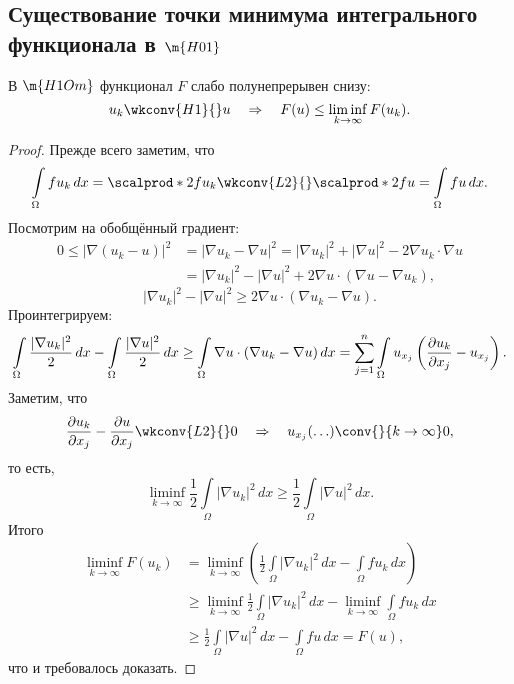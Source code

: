 \subsection{Существование точки минимума интегрального функционала в $\m{H01}$}
\begin{lemma} В $\m{H1Om}$ функционал $F$ слабо полунепрерывен снизу:
$$u_k \wkconv{H1}{} u \quad \Rightarrow \quad F(u) \leq \liminf_{k \to \infty} F(u_k).$$
\end{lemma}
\begin{proof} Прежде всего заметим, что
$$ \int \limits_\Omega f u_k \, dx = \scalprod*{2}{f}{u_k} \wkconv{L2}{} \scalprod*{2}{f}{u} =\int \limits_\Omega f u \, dx.$$
Посмотрим на обобщённый градиент:
\begin{align*}
0 \leq | \nabla (u_k - u) |^2 &= | \nabla u_k - \nabla u |^2 = |\nabla u_k|^2 + |\nabla u|^2 - 2 \nabla u_k \cdot \nabla u \\
&= |\nabla u_k|^2 - |\nabla u|^2 + 2 \nabla u \cdot (\nabla u - \nabla u_k),
\end{align*}
$$ |\nabla u_k|^2 - |\nabla u|^2 \geq 2 \nabla u \cdot (\nabla u_k - \nabla u).$$
Проинтегрируем:
$$ \int \limits_\Omega \frac {| \nabla u_k|^2} {2} \, dx - \int \limits_\Omega \frac {| \nabla u|^2} {2} \, dx \geq \int \limits_\Omega \nabla u \cdot (\nabla u_k - \nabla u) \, dx = \sum_{j=1}^n \int \limits_\Omega u_{x_j} \left( \pder[u_k]{x_j} - u_{x_j} \right) .$$
Заметим, что
$$ \pder[u_k]{x_j} - \pder[u]{x_j} \wkconv{L2}{} 0 \quad \Rightarrow \quad u_{x_j} (\hdots) \conv{}{k \to \infty} 0,$$
то есть,
$$ \liminf_{k \to \infty} \frac {1} {2} \int \limits_\Omega |\nabla u_k|^2 \, dx \geq \frac {1} {2} \int \limits_\Omega |\nabla u|^2 \, dx.$$
Итого
\begin{align*}
\liminf_{k \to \infty} F(u_k) &= \liminf_{k \to \infty}\left( \frac {1}{2} \int \limits_\Omega |\nabla u_k|^2 \, dx - \int \limits_\Omega fu_k \, dx \right) \\
&\geq \liminf_{k \to \infty} \frac {1} {2} \int \limits_\Omega |\nabla u_k|^2 \, dx - \liminf_{k \to \infty} \int \limits_\Omega fu_k \, dx \\
&\geq \frac {1} {2} \int \limits_\Omega |\nabla u|^2 \, dx - \int \limits_\Omega fu \, dx = F(u),
\end{align*}
что и требовалось доказать.

\end{proof}

